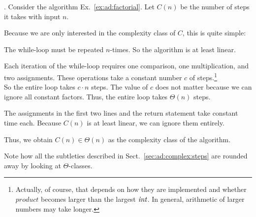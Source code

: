 \begin{example}\label{ex:ad:factorial:complex}.
Consider the algorithm Ex.~\ref{ex:ad:factorial}.
Let $C(n)$ be the number of steps it takes with input $n$.

Because we are only interested in the complexity class of $C$, this is quite simple:
\begin{compactenum}
\item The while-loop must be repeated $n$-times. So the algorithm is at least linear.
\item Each iteration of the while-loop requires one comparison, one multiplication, and two assignments.
 These operations take a constant number $c$ of steps.\footnote{Actually, of course, that depends on how they are implemented and whether $product$ becomes larger than the largest $\mathit{int}$. In general, arithmetic of larger numbers may take longer.}\\
 So the entire loop takes $c\cdot n$ steps. The value of $c$ does not matter because we can ignore all constant factors. Thus, the entire loop takes $\Theta(n)$ steps.
\item The assignments in the first two lines and the return statement take constant time each.
Because $C(n)$ is at least linear, we can ignore them entirely.
\item Thus, we obtain $C(n)\in \Theta(n)$ as the complexity class of the algorithm.
\end{compactenum}
\end{example}

Note how all the subtleties described in Sect.~\ref{sec:ad:complex:steps} are rounded away by looking at $\Theta$-classes.
\medskip

